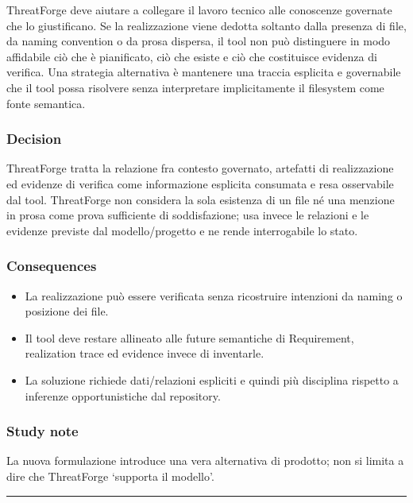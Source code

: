 \documentclass[
  10pt,
  a4paper,
]{article}
\providecommand{\tightlist}{%
  \setlength{\itemsep}{0pt}\setlength{\parskip}{0pt}}
\begin{document}
ThreatForge deve aiutare a collegare il lavoro tecnico alle conoscenze
governate che lo giustificano. Se la realizzazione viene dedotta
soltanto dalla presenza di file, da naming convention o da prosa
dispersa, il tool non può distinguere in modo affidabile ciò che è
pianificato, ciò che esiste e ciò che costituisce evidenza di verifica.
Una strategia alternativa è mantenere una traccia esplicita e
governabile che il tool possa risolvere senza interpretare
implicitamente il filesystem come fonte semantica.

\subsubsection{Decision}\label{decision-2}

ThreatForge tratta la relazione fra contesto governato, artefatti di
realizzazione ed evidenze di verifica come informazione esplicita
consumata e resa osservabile dal tool. ThreatForge non considera la sola
esistenza di un file né una menzione in prosa come prova sufficiente di
soddisfazione; usa invece le relazioni e le evidenze previste dal
modello/progetto e ne rende interrogabile lo stato.

\subsubsection{Consequences}\label{consequences-2}

\begin{itemize}
\tightlist
\item
  La realizzazione può essere verificata senza ricostruire intenzioni da
  naming o posizione dei file.
\item
  Il tool deve restare allineato alle future semantiche di Requirement,
  realization trace ed evidence invece di inventarle.
\item
  La soluzione richiede dati/relazioni espliciti e quindi più disciplina
  rispetto a inferenze opportunistiche dal repository.
\end{itemize}

\subsubsection{Study note}\label{study-note-2}

La nuova formulazione introduce una vera alternativa di prodotto; non si
limita a dire che ThreatForge `supporta il modello'.

\begin{center}\rule{0.5\linewidth}{0.5pt}\end{center}
\end{document}
